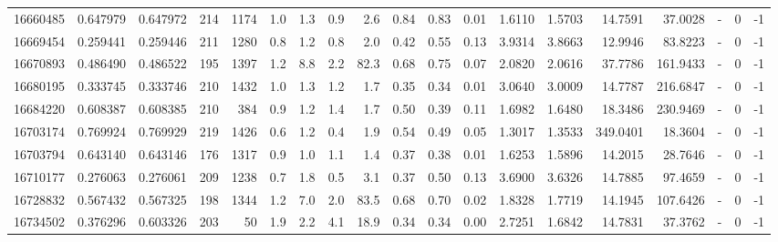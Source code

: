 \begin{tabular}{rrrrrrrrrrrrrrrrlrr}
  16660485 & 0.647979 &   0.647972 &  214 & 1174 &      1.0 &      1.3 &     0.9 &      2.6 &       0.84 &        0.83 &        0.01 &  1.6110 &  1.5703 &   14.7591 &   37.0028 &             - &        0 &         -1 \\
  16669454 & 0.259441 &   0.259446 &  211 & 1280 &      0.8 &      1.2 &     0.8 &      2.0 &       0.42 &        0.55 &        0.13 &  3.9314 &  3.8663 &   12.9946 &   83.8223 &             - &        0 &         -1 \\
  16670893 & 0.486490 &   0.486522 &  195 & 1397 &      1.2 &      8.8 &     2.2 &     82.3 &       0.68 &        0.75 &        0.07 &  2.0820 &  2.0616 &   37.7786 &  161.9433 &             - &        0 &         -1 \\
  16680195 & 0.333745 &   0.333746 &  210 & 1432 &      1.0 &      1.3 &     1.2 &      1.7 &       0.35 &        0.34 &        0.01 &  3.0640 &  3.0009 &   14.7787 &  216.6847 &             - &        0 &         -1 \\
  16684220 & 0.608387 &   0.608385 &  210 &  384 &      0.9 &      1.2 &     1.4 &      1.7 &       0.50 &        0.39 &        0.11 &  1.6982 &  1.6480 &   18.3486 &  230.9469 &             - &        0 &         -1 \\
  16703174 & 0.769924 &   0.769929 &  219 & 1426 &      0.6 &      1.2 &     0.4 &      1.9 &       0.54 &        0.49 &        0.05 &  1.3017 &  1.3533 &  349.0401 &   18.3604 &             - &        0 &         -1 \\
  16703794 & 0.643140 &   0.643146 &  176 & 1317 &      0.9 &      1.0 &     1.1 &      1.4 &       0.37 &        0.38 &        0.01 &  1.6253 &  1.5896 &   14.2015 &   28.7646 &             - &        0 &         -1 \\
  16710177 & 0.276063 &   0.276061 &  209 & 1238 &      0.7 &      1.8 &     0.5 &      3.1 &       0.37 &        0.50 &        0.13 &  3.6900 &  3.6326 &   14.7885 &   97.4659 &             - &        0 &         -1 \\
  16728832 & 0.567432 &   0.567325 &  198 & 1344 &      1.2 &      7.0 &     2.0 &     83.5 &       0.68 &        0.70 &        0.02 &  1.8328 &  1.7719 &   14.1945 &  107.6426 &             - &        0 &         -1 \\
  16734502 & 0.376296 &   0.603326 &  203 &   50 &      1.9 &      2.2 &     4.1 &     18.9 &       0.34 &        0.34 &        0.00 &  2.7251 &  1.6842 &   14.7831 &   37.3762 &             - &        0 &         -1 \\

\end{tabular}
